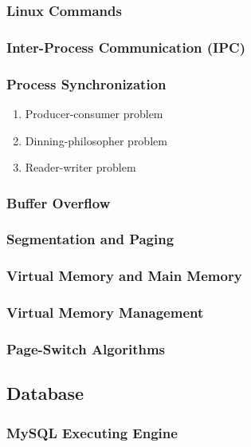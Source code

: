 \documentclass[11pt, twocolumn]{article}
\begin{document}
\subsubsection{Linux Commands}

\subsubsection{Inter-Process Communication (IPC)}

\subsubsection{Process Synchronization}
\begin{enumerate}
	\item Producer-consumer problem
	\item Dinning-philosopher problem
	\item Reader-writer problem
\end{enumerate}

\subsubsection{Buffer Overflow}

\subsubsection{Segmentation and Paging}

\subsubsection{Virtual Memory and Main Memory}

\subsubsection{Virtual Memory Management}

\subsubsection{Page-Switch Algorithms}

\subsection{Database}

\subsubsection{MySQL Executing Engine}
\end{document}
